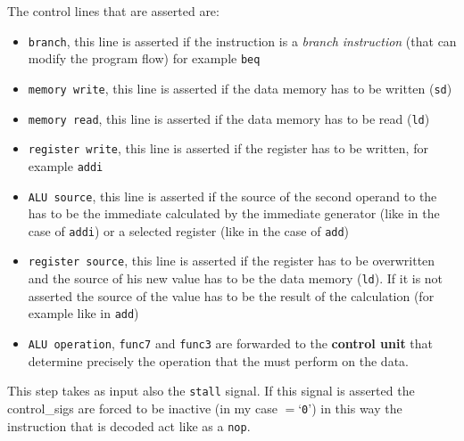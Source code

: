 \documentclass{article}
\begin{document}
The control lines that are asserted are:
\begin{itemize}
    \item \texttt{branch}, this line is asserted if the instruction is a \emph{branch instruction} 
    (that can modify the program flow) for example \texttt{beq}
    \item \texttt{memory write}, this line is asserted if the data memory has to be written (\texttt{sd})
    \item \texttt{memory read}, this line is asserted if the data memory has to be read (\texttt{ld})
    \item \texttt{register write}, this line is asserted if the register has to be written, for example \texttt{addi}
    \item \texttt{ALU source}, this line is asserted if the source of the second operand 
    to the \ALU has to be the immediate calculated by the immediate generator  
    (like in the case of \texttt{addi}) or a selected register (like in the case of \texttt{add})
    \item \texttt{register source}, this line is asserted if the register has to be overwritten 
    and the source of his new value has to be the data memory (\texttt{ld}). 
    If it is not asserted the source of the value has to be the result of the \ALU calculation (for example like in \texttt{add})
    \item \texttt{ALU operation}, \texttt{func7} and \texttt{func3} are forwarded 
    to the \textbf{\ALU control unit}  that determine precisely the operation that the \ALU must perform on the data.
\end{itemize}

This step takes as input also the \texttt{stall} signal. If this signal is asserted the \glspl{control_sig} 
are forced to be inactive (in my case $=$`\texttt{0}') in this way the instruction that is decoded act like as a \texttt{nop}.
\end{document}
